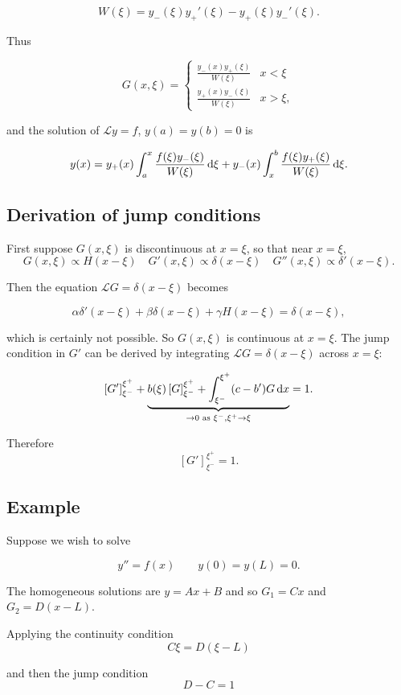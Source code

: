 \documentclass{notes}
\theoremstyle{plain}
\newcommand{\cL}{\mathcal{L}}
\begin{document}
\[
W(\xi) = y_-(\xi) y_+'(\xi) - y_+(\xi)y_-'(\xi).
\]

Thus

\[
G(x,\xi) = \begin{cases}
\frac{y_-(x) y_+(\xi)}{W(\xi)} & x < \xi \\
\frac{y_+(x) y_-(\xi)}{W(\xi)} & x > \xi,
\end{cases}
\]

and the solution of $\cL y = f$, $y(a) = y(b) = 0$ is

\[
y(x) = y_+(x) \int_a^x \frac{f(\xi) y_-(\xi)}{W(\xi)} \, \mathrm{d}\xi +
y_-(x) \int_x^b \frac{f(\xi) y_+(\xi)}{W(\xi)}\, \mathrm{d}\xi.
\]

\subsection{Derivation of jump conditions}

First suppose $G(x,\xi)$ is discontinuous at $x=\xi$, so that near
$x=\xi$,
\[
G(x,\xi) \propto H(x-\xi) \quad G'(x,\xi) \propto \delta(x-\xi) \quad
G''(x,\xi) \propto \delta'(x-\xi).
\]

Then the equation $\cL G = \delta(x-\xi)$ becomes

\[
\alpha \delta'(x-\xi) + \beta \delta(x-\xi) + \gamma H(x-\xi)
= \delta(x-\xi),
\]

which is certainly not possible.  So $G(x,\xi)$ is continuous at
$x=\xi$.  The jump condition in $G'$ can be derived by integrating
$\cL G = \delta(x-\xi)$ across $x = \xi$:

\[
\left[ G' \right]_{\xi^-}^{\xi^+} +
\underbrace{b(\xi) \left[ G \right]_{\xi^-}^{\xi^+}
+ \int_{\xi^-}^{\xi^+} (c-b') G\, \mathrm{d} x}_{\to 0 \text{ as }
\xi^-,\xi^+ \to \xi} = 1.
\]

Therefore
\[
\left[ G' \right]_{\xi^-}^{\xi^+} = 1.
\]

\subsection{Example}

Suppose we wish to solve

\[
y'' = f(x) \qquad y(0) = y(L) = 0.
\]

The homogeneous solutions are $y = A x + B$ and so
$G_1 = C x$ and $G_2 = D (x - L)$.

Applying the continuity condition
\[
C \xi = D (\xi - L)
\]

and then the jump condition
\[
D - C = 1
\]
\end{document}
